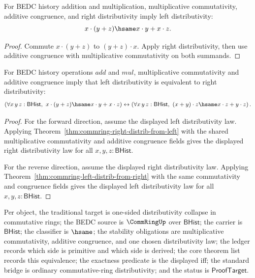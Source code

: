 \begin{theorem}
\label{thm:commring-left-distrib-from-right}
For BEDC history addition and multiplication, multiplicative commutativity,
additive congruence, and right distributivity imply left distributivity:
$$
x\cdot(y+z)\hsame x\cdot y + x\cdot z .
$$
\end{theorem}
\begin{proof}
Commute $x\cdot(y+z)$ to $(y+z)\cdot x$. Apply right distributivity, then
use additive congruence with multiplicative commutativity on both summands.
\end{proof}

\begin{theorem}
\label{thm:commring-one-sided-distributivity-equivalence}
For BEDC history operations $add$ and $mul$, multiplicative commutativity and
additive congruence imply that left distributivity is equivalent to right
distributivity:
$$
\left(\forall x\,y\,z : \mathsf{BHist},\ x\cdot(y+z)\hsame x\cdot y+x\cdot z\right)
\leftrightarrow
\left(\forall x\,y\,z : \mathsf{BHist},\ (x+y)\cdot z\hsame x\cdot z+y\cdot z\right).
$$
\end{theorem}
\begin{proof}
For the forward direction, assume the displayed left distributivity law. Applying
Theorem~\ref{thm:commring-right-distrib-from-left} with the shared
multiplicative commutativity and additive congruence fields gives the displayed
right distributivity law for all $x,y,z : \mathsf{BHist}$.

For the reverse direction, assume the displayed right distributivity law.
Applying Theorem~\ref{thm:commring-left-distrib-from-right} with the same
commutativity and congruence fields gives the displayed left distributivity law
for all $x,y,z : \mathsf{BHist}$.
\end{proof}

Per object, the traditional target is one-sided distributivity collapse in
commutative rings; the BEDC source is $\CommRingUp$ over $\mathsf{BHist}$; the
carrier is $\mathsf{BHist}$; the classifier is $\hsame$; the stability
obligations are multiplicative commutativity, additive congruence, and one
chosen distributivity law; the ledger records which side is primitive and which
side is derived; the core theorem list records this equivalence; the exactness
predicate is the displayed iff; the standard bridge is ordinary
commutative-ring distributivity; and the status is $\mathsf{ProofTarget}$.


